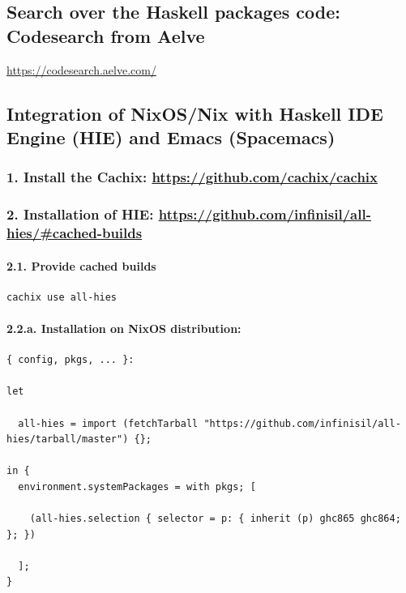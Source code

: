 \documentclass[11pt]{article}
\begin{document}
\subsection{Search over the Haskell packages code: Codesearch from Aelve}
\label{sec:org5fba6f9}
\url{https://codesearch.aelve.com/}\\

\subsection{Integration of NixOS/Nix with Haskell IDE Engine (HIE) and Emacs (Spacemacs)}
\label{sec:org637aebf}
\subsubsection{1. Install the Cachix: \url{https://github.com/cachix/cachix}}
\label{sec:org42df23b}

\subsubsection{2. Installation of HIE: \url{https://github.com/infinisil/all-hies/\#cached-builds}}
\label{sec:org55733d0}

\paragraph{2.1. Provide cached builds}
\label{sec:org63308a4}

\begin{verbatim}
cachix use all-hies
\end{verbatim}

\paragraph{2.2.a. Installation on NixOS distribution:}
\label{sec:org1636fdd}

\begin{verbatim}
{ config, pkgs, ... }:

let

  all-hies = import (fetchTarball "https://github.com/infinisil/all-hies/tarball/master") {};

in {
  environment.systemPackages = with pkgs; [

    (all-hies.selection { selector = p: { inherit (p) ghc865 ghc864; }; })

  ];
}
\end{verbatim}
\end{document}
